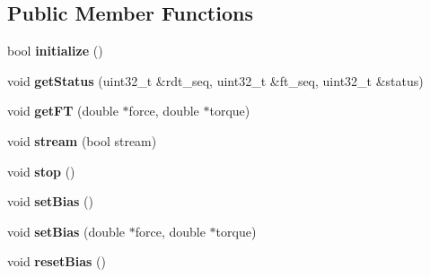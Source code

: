 \subsection*{Public Member Functions}
\begin{DoxyCompactItemize}
\item 
\mbox{\label{classati__ft__sensor_1_1AtiFTSensor_aa8c6b79e86229c5a3040aa584b41315c}} 
bool {\bfseries initialize} ()
\item 
\mbox{\label{classati__ft__sensor_1_1AtiFTSensor_ad81139f635267570ef24146aa42e79e3}} 
void {\bfseries get\+Status} (uint32\+\_\+t \&rdt\+\_\+seq, uint32\+\_\+t \&ft\+\_\+seq, uint32\+\_\+t \&status)
\item 
\mbox{\label{classati__ft__sensor_1_1AtiFTSensor_a36beff3967fe1dee6e03e0f365003152}} 
void {\bfseries get\+FT} (double $\ast$force, double $\ast$torque)
\item 
\mbox{\label{classati__ft__sensor_1_1AtiFTSensor_a8216e2f36a4d98a118c08f3a7975ed77}} 
void {\bfseries stream} (bool stream)
\item 
\mbox{\label{classati__ft__sensor_1_1AtiFTSensor_a56e90ab175ed70198a5f7f17064d78ac}} 
void {\bfseries stop} ()
\item 
\mbox{\label{classati__ft__sensor_1_1AtiFTSensor_a659d13141fb516206fcf27c609dcab92}} 
void {\bfseries set\+Bias} ()
\item 
\mbox{\label{classati__ft__sensor_1_1AtiFTSensor_a1eb465631b61e83def48c419d2994185}} 
void {\bfseries set\+Bias} (double $\ast$force, double $\ast$torque)
\item 
\mbox{\label{classati__ft__sensor_1_1AtiFTSensor_a0746f28aa6b624427ad6b4074b64c859}} 
void {\bfseries reset\+Bias} ()
\end{DoxyCompactItemize}
